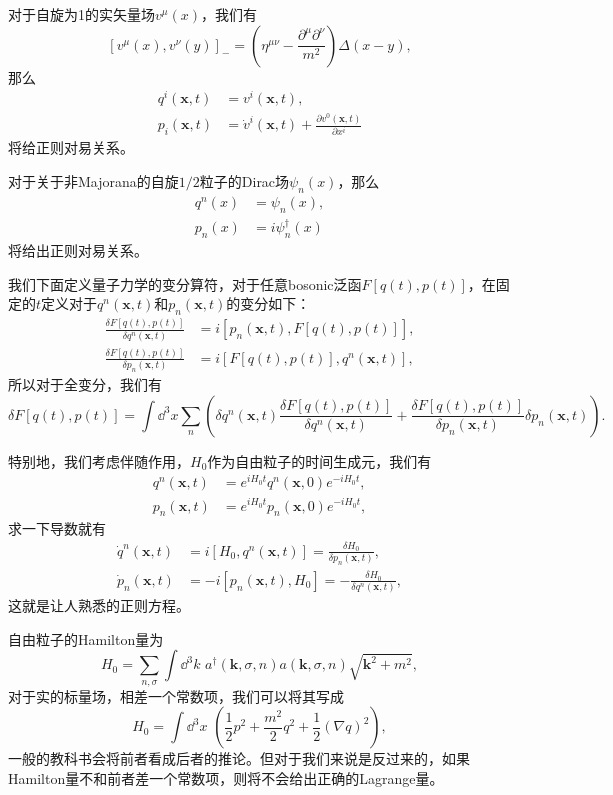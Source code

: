 \documentclass[9pt]{extbook}
\theoremstyle{plain}%
\begin{document}
对于自旋为1的实矢量场$v^\mu(x)$，我们有
\[
	[v^\mu(x),v^\nu(y)]_-=\left(\eta^{\mu\nu}-\frac{\partial^\mu\partial^\nu}{m^2}\right)\Delta(x-y),
\]
那么
\[
	\begin{split}
	q^i(\mathbf{x},t)&=v^i(\mathbf{x},t),\\
	p_i(\mathbf{x},t)&=\dot{v}^i(\mathbf{x},t)+\frac{\partial v^0(\mathbf{x},t)}{\partial x^i}
	\end{split}
\]
将给正则对易关系。

对于关于非Majorana的自旋$1/2$粒子的Dirac场$\psi_n(x)$，那么
\[
	\begin{split}
	q^n(x)&=\psi_n(x),\\
	p_n(x)&=i\psi^\dag_n(x)
	\end{split}
\]
将给出正则对易关系。

我们下面定义量子力学的变分算符，对于任意bosonic泛函$F[q(t),p(t)]$，在固定的$t$定义对于$q^n(\mathbf{x},t)$和$p_n(\mathbf{x},t)$的变分如下：
\[
	\begin{split}
	\frac{\delta F[q(t),p(t)]}{\delta q^n(\mathbf{x},t)}&=i\left[p_n(\mathbf{x},t),F[q(t),p(t)]\right],\\
	\frac{\delta F[q(t),p(t)]}{\delta p_n(\mathbf{x},t)}&=i\left[F[q(t),p(t)],q^n(\mathbf{x},t)\right],
	\end{split}
\]
所以对于全变分，我们有
\[
	\delta F[q(t),p(t)]=\int \dd^3 x\sum_n\left(\delta q^n(\mathbf{x},t)\frac{\delta F[q(t),p(t)]}{\delta q^n(\mathbf{x},t)}+\frac{\delta F[q(t),p(t)]}{\delta p_n(\mathbf{x},t)}\delta p_n(\mathbf{x},t)\right).
\]

特别地，我们考虑伴随作用，$H_0$作为自由粒子的时间生成元，我们有
\[
\begin{split}
	q^n(\mathbf{x},t)&=e^{iH_0t}q^n(\mathbf{x},0)e^{-iH_0t},\\
	p_n(\mathbf{x},t)&=e^{iH_0t}p_n(\mathbf{x},0)e^{-iH_0t},
\end{split}
\]
求一下导数就有
\[
\begin{split}
	\dot{q}^n(\mathbf{x},t)&=i[H_0,q^n(\mathbf{x},t)]=\frac{\delta H_0}{\delta p_n(\mathbf{x},t)},\\
	\dot{p}_n(\mathbf{x},t)&=-i[p_n(\mathbf{x},t),H_0]=-\frac{\delta H_0}{\delta q^n(\mathbf{x},t)},
\end{split}
\]
这就是让人熟悉的正则方程。

自由粒子的Hamilton量为
\[
	H_0=\sum_{n,\sigma}\int \dd^3 k\,\,a^\dag(\mathbf{k},\sigma,n)a(\mathbf{k},\sigma,n)\sqrt{\mathbf{k}^2+m^2},
\]
对于实的标量场，相差一个常数项，我们可以将其写成
\[
	H_0=\int \dd^3 x\,\,\left(\frac{1}{2}p^2+\frac{m^2}{2}q^2+\frac{1}{2}(\nabla q)^2\right),
\]
一般的教科书会将前者看成后者的推论。但对于我们来说是反过来的，如果Hamilton量不和前者差一个常数项，则将不会给出正确的Lagrange量。
\end{document}
